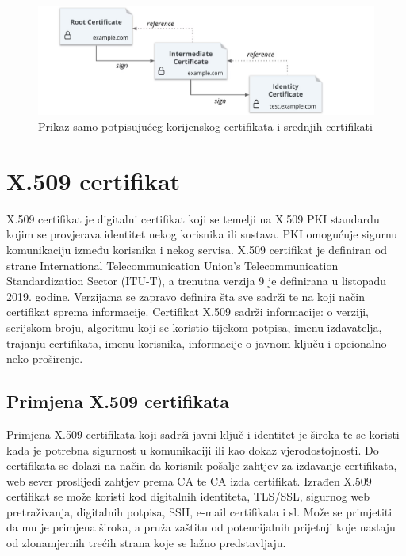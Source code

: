 \documentclass[]{foi}
\begin{document}
\begin{figure}[htbp]
    \centering
    \includegraphics[width=1.0\textwidth]{assets/hashicorp-certificates.png}
    \caption{Prikaz samo-potpisujućeg korijenskog certifikata i srednjih certifikati \cite{hashicorp-vault-pki-engine}}
\end{figure}


\chapter{X.509 certifikat}

X.509 certifikat je digitalni certifikat koji se temelji na X.509 PKI standardu kojim se provjerava identitet nekog korisnika ili sustava.
PKI omogućuje sigurnu komunikaciju između korisnika i nekog servisa.
X.509 certifikat je definiran od strane International Telecommunication Union's Telecommunication Standardization Sector (ITU-T), a trenutna verzija 9 je definirana u listopadu 2019. godine.
Verzijama se zapravo definira šta sve sadrži te na koji način certifikat sprema informacije.
Certifikat X.509 sadrži informacije: o verziji, serijskom broju, algoritmu koji se koristio tijekom potpisa, imenu izdavatelja, trajanju certifikata, imenu korisnika, informacije o javnom ključu i opcionalno neko proširenje.
\cite{techtarget-x509-certificate}

\section{Primjena X.509 certifikata}

Primjena X.509 certifikata koji sadrži javni ključ i identitet je široka te se koristi kada je potrebna sigurnost u komunikaciji ili kao dokaz vjerodostojnosti.
Do certifikata se dolazi na način da korisnik pošalje zahtjev za izdavanje certifikata, web sever proslijedi zahtjev prema CA te CA izda certifikat.
Izrađen X.509 certifikat se može koristi kod digitalnih identiteta, TLS/SSL, sigurnog web pretraživanja, digitalnih potpisa, SSH, e-mail certifikata i sl.
Može se primjetiti da mu je primjena široka, a pruža zaštitu od potencijalnih prijetnji koje nastaju od zlonamjernih trećih strana koje se lažno predstavljaju.
\cite{techtarget-x509-certificate}
\end{document}
